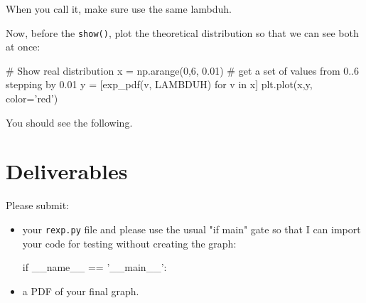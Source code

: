 \begin{fullwidth}
\noindent When you call it, make sure use the same lambduh.

\step Now, before the {\tt show()}, plot the theoretical distribution so that we can see both at once:

\begin{pyverbatim}
# Show real distribution
x = np.arange(0,6, 0.01) # get a set of values from 0..6 stepping by 0.01
y = [exp_pdf(v, LAMBDUH) for v in x]
plt.plot(x,y, color='red')
\end{pyverbatim}

\noindent You should see the following.\\


\section{Deliverables}

Please submit:

\begin{itemize}
\item your {\tt rexp.py} file and please use the usual "if main" gate so that I can import your code for testing without creating the graph:
\begin{pyverbatim}
if __name__ == '__main__':
\end{pyverbatim}

\item a PDF of your final graph.
\end{itemize}

\end{fullwidth}
